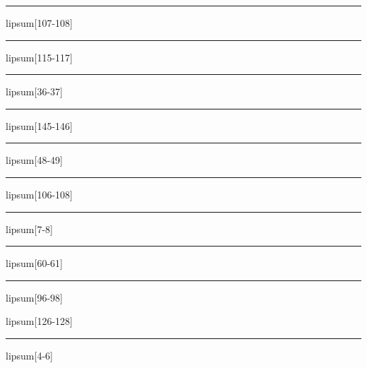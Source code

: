\documentclass[11pt,a4paper]{article}
\begin{document}
\begin{simplewrap}
  \textcolor{cyan!53}{\rule{4.8cm}{7.0cm}}
\end{simplewrap}
lipsum[107-108]

\begin{simplewrap}
  \textcolor{purple!37}{\rule{5.9cm}{9.3cm}}
\end{simplewrap}
lipsum[115-117]

\begin{simplewrap}
  \textcolor{yellow!51}{\rule{3.4cm}{6.3cm}}
\end{simplewrap}
lipsum[36-37]

\begin{simplewrap}
  \textcolor{cyan!18}{\rule{4.3cm}{9.3cm}}
\end{simplewrap}
lipsum[145-146]

\begin{simplewrap}
  \textcolor{brown!14}{\rule{4.7cm}{9.6cm}}
\end{simplewrap}
lipsum[48-49]

\begin{simplewrap}
  \textcolor{purple!56}{\rule{3.1cm}{4.5cm}}
\end{simplewrap}
lipsum[106-108]

\begin{simplewrap}
  \textcolor{teal!19}{\rule{5.3cm}{2.9cm}}
\end{simplewrap}
lipsum[7-8]

\begin{simplewrap}
  \textcolor{teal!48}{\rule{4.7cm}{3.8cm}}
\end{simplewrap}
lipsum[60-61]

\begin{simplewrap}
  \textcolor{lime!15}{\rule{5.1cm}{5.8cm}}
\end{simplewrap}
lipsum[96-98]

lipsum[126-128]

\begin{simplewrap}
  \textcolor{red!18}{\rule{3.5cm}{3.8cm}}
\end{simplewrap}
lipsum[4-6]
\end{document}
